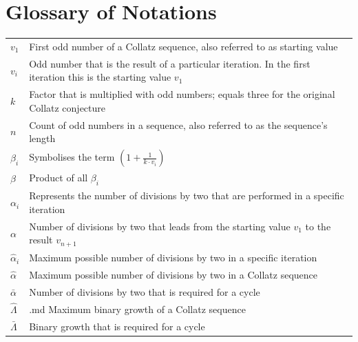 \documentclass{SciPress_2015}
\begin{document}
\vfill

\section{Glossary of Notations}
\label{appx:glossary_of_notations}
\vspace{-1em}
\begin{table}[H]
	\centering
	\setlength{\tabcolsep}{1,2em}\setlength\extrarowheight{3pt}
	\begin{tabular}{|l|p{13.5cm}|}
		\hline
		\thead{\textbf{Notation}} &
		\thead{\textbf{Description}}\\
		\hline
		$v_1$ &
		First odd number of a Collatz sequence, also referred to as starting value\\
		\hline
		$v_i$ &
		Odd number that is the result of a particular iteration. In the first iteration this is the starting value $v_1$\\
		\hline
		$k$ &
		Factor that is multiplied with odd numbers; equals three for the original Collatz conjecture\\
		\hline
		$n$ &
		Count of odd numbers in a sequence, also referred to as the sequence's length\\
		\hline
		$\beta_i$ &
		Symbolises the term $\left(1+\frac{1}{k\cdot v_i}\right)$\\
		\hline
		$\beta$ &
		Product of all $\beta_i$\\
		\hline
		$\alpha_i$ &
		Represents the number of divisions by two that are performed in a specific iteration\\
		\hline
		$\alpha$ &
		Number of divisions by two that leads from the starting value $v_1$ to the result $v_{n+1}$\\
		\hline
		$\hat\alpha_i$ &
		Maximum possible number of divisions by two in a specific iteration\\
		\hline
		$\hat\alpha$ &
		Maximum possible number of divisions by two in a Collatz sequence\\
		\hline
		$\bar\alpha$ &
		Number of divisions by two that is required for a cycle\\
		\hline
		$\hat\Lambda$ &.md
		Maximum binary growth of a Collatz sequence\\
		\hline
		$\bar\Lambda$ &
		Binary growth that is required for a cycle\\
		\hline
	\end{tabular}
\end{table}
\end{document}
